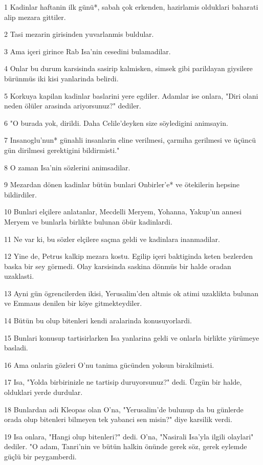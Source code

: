 \par 1 Kadinlar haftanin ilk günü*, sabah çok erkenden, hazirlamis olduklari baharati alip mezara gittiler.
\par 2 Tasi mezarin girisinden yuvarlanmis buldular.
\par 3 Ama içeri girince Rab Isa'nin cesedini bulamadilar.
\par 4 Onlar bu durum karsisinda sasirip kalmisken, simsek gibi parildayan giysilere bürünmüs iki kisi yanlarinda belirdi.
\par 5 Korkuya kapilan kadinlar baslarini yere egdiler. Adamlar ise onlara, "Diri olani neden ölüler arasinda ariyorsunuz?" dediler.
\par 6 "O burada yok, dirildi. Daha Celile'deyken size söyledigini animsayin.
\par 7 Insanoglu'nun* günahli insanlarin eline verilmesi, çarmiha gerilmesi ve üçüncü gün dirilmesi gerektigini bildirmisti."
\par 8 O zaman Isa'nin sözlerini animsadilar.
\par 9 Mezardan dönen kadinlar bütün bunlari Onbirler'e* ve ötekilerin hepsine bildirdiler.
\par 10 Bunlari elçilere anlatanlar, Mecdelli Meryem, Yohanna, Yakup'un annesi Meryem ve bunlarla birlikte bulunan öbür kadinlardi.
\par 11 Ne var ki, bu sözler elçilere saçma geldi ve kadinlara inanmadilar.
\par 12 Yine de, Petrus kalkip mezara kostu. Egilip içeri baktiginda keten bezlerden baska bir sey görmedi. Olay karsisinda saskina dönmüs bir halde oradan uzaklasti.
\par 13 Ayni gün ögrencilerden ikisi, Yerusalim'den altmis ok atimi uzaklikta bulunan ve Emmaus denilen bir köye gitmekteydiler.
\par 14 Bütün bu olup bitenleri kendi aralarinda konusuyorlardi.
\par 15 Bunlari konusup tartisirlarken Isa yanlarina geldi ve onlarla birlikte yürümeye basladi.
\par 16 Ama onlarin gözleri O'nu tanima gücünden yoksun birakilmisti.
\par 17 Isa, "Yolda birbirinizle ne tartisip duruyorsunuz?" dedi. Üzgün bir halde, olduklari yerde durdular.
\par 18 Bunlardan adi Kleopas olan O'na, "Yerusalim'de bulunup da bu günlerde orada olup bitenleri bilmeyen tek yabanci sen misin?" diye karsilik verdi.
\par 19 Isa onlara, "Hangi olup bitenleri?" dedi. O'na, "Nasirali Isa'yla ilgili olaylari" dediler. "O adam, Tanri'nin ve bütün halkin önünde gerek söz, gerek eylemde güçlü bir peygamberdi.
